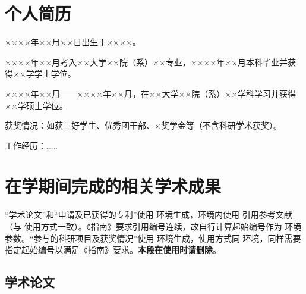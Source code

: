 
\begin{resume}

  \section*{个人简历}

  ××××年××月××日出生于××××。

  ××××年××月考入××大学××院（系）××专业，××××年××月本科毕业并获得××学学士学位。

  ××××年××月——××××年××月，在××大学××院（系）××学科学习并获得××学硕士学位。

  获奖情况：如获三好学生、优秀团干部、×奖学金等（不含科研学术获奖）。

  工作经历：……

  \section*{在学期间完成的相关学术成果}

  “学术论文”和“申请及已获得的专利”使用  环境生成，环境内使用  引用参考文献（与 使用方式一致）。《指南》要求引用编号连续，故自行计算起始编号作为  环境参数。“参与的科研项目及获奖情况”使用  环境生成，使用方式同  环境，同样需要指定起始编号以满足《指南》要求。\textbf{本段在使用时请删除}。

  \subsection{学术论文}



\end{resume}
